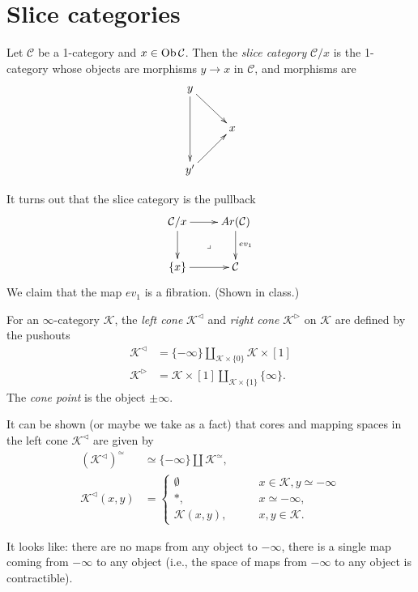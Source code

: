 \section{Slice categories}
\label{section-slice}

Let $\mathcal{C}$ be a 1-category and $x \in \mathop{\mathrm{Ob}}\nolimits \mathcal{C}$.
Then the {\it slice category} $\mathcal{C}/x$ 
is the 1-category whose objects are morphisms
$y \to x$ in $\mathcal{C}$, and morphisms are
$$
\xymatrix{
y\ar[dd]\ar[dr]\\
& x\\
y'\ar[ur]
}
$$

It turns out that the slice category is the pullback
$$
\xymatrix{
\mathcal{C}/x\ar[r]\ar[d]\ar@{}[dr]|-{\lrcorner}&Ar(\mathcal{C})\ar[d]^{ev_1}\\
\{x\}\ar[r]&\mathcal{C}
}
$$
We claim that the map $ev_1$ is a fibration.
(Shown in class.)

\begin{definition}
\label{definition-cone}
For an $\infty$-category $\mathcal{K}$,
the {\it left cone} $\mathcal{K}^{\triangleleft}$ 
and {\it right cone} $\mathcal{K}^{\triangleright}$ on $\mathcal{K}$ 
are defined by the pushouts
\begin{align*}
\mathcal{K}^{\triangleleft}&
=\{-\infty\}\amalg_{\mathcal{K}\times\{0\}}\mathcal{K}\times[1]\\
\mathcal{K}^{\triangleright}&
=\mathcal{K}\times[1]\amalg_{\mathcal{K}\times\{1\}}\{\infty\}.
\end{align*}
The {\it cone point} is the object $\pm \infty$.
\end{definition}

It can be shown (or maybe we take as a fact)
that cores and mapping spaces in the left cone $\mathcal{K}^{\triangleleft}$ 
are given by
\begin{align*}
(\mathcal{K}^{\triangleleft})^\simeq&
\simeq \{-\infty\}\amalg\mathcal{K}^\simeq,\\
\mathcal{K}^{\triangleleft}(x,y)&=
\begin{cases}
\emptyset\qquad &x \in \mathcal{K}, y \simeq -\infty \\
\ast,\qquad &x \simeq -\infty,\\
\mathcal{K}(x,y),\qquad &x,y \in \mathcal{K}.
\end{cases}
\end{align*}

\noindent
It looks like: there are no maps from any object to $-\infty$,
there is a single map coming from $-\infty$ to any object
(i.e., the space of maps from $-\infty$ to any object is contractible).

